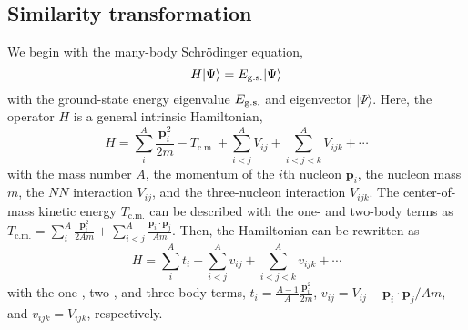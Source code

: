 \documentclass[aps,prc, dvips, twocolumn,groupedaddress,showkeys,showpacs,floatfix,superscriptaddress]{revtex4-1}
\newcommand{\<}{\langle}
\renewcommand{\>}{\rangle}
\begin{document}
 \subsection{Similarity transformation\label{sec:sim}}
We begin with the many-body Schr\"odinger equation,
 \begin{equation}
   \label{sch_eq_ori}
   H|\Psi\> = E_{\rm g.s.}|\Psi\>
 \end{equation}
 with the ground-state energy eigenvalue $E_{\rm g.s.}$ and eigenvector $|\Psi\>$.
Here, the operator $H$ is a general intrinsic Hamiltonian,
\begin{equation}
 H= \sum_{i}^{A}\frac{\mathbf{p}^{2}_{i}}{2m} - T_{\text{c.m.}} + \sum_{i<j}^{A}
  V_{ij} + \sum_{i<j<k}^{A} V_{ijk} + \cdots
\label{H_ori}
\end{equation}
with the mass number $A$, the momentum of the $i$th nucleon $\mathbf{p}_{i}$,
 the nucleon mass $m$,
 the $NN$ interaction $V_{ij}$, and the three-nucleon interaction $V_{ijk}$.
The center-of-mass kinetic energy $T_{\text{c.m.}}$
can be described with the one- and two-body terms as $T_{\text{c.m.}} =
 \sum_{i}^{A}\frac{\mathbf{p}^{2}_{i}}{2Am} +
 \sum_{i<j}^{A}\frac{\mathbf{p}_{i} \cdot \mathbf{p}_{j}}{Am}$.
Then, the Hamiltonian can be rewritten as
\begin{equation}
 \label{H_ori2}
  H=\sum_{i}^{A}t_{i}+\sum_{i<j}^{A}v_{ij} + \sum_{i<j<k}^{A}v_{ijk} + \cdots
\end{equation}
with the one-, two-, and three-body terms,
$t_{i}=\frac{A-1}{A}\frac{\mathbf{p}_{i}^{2}}{2m}$,
$v_{ij} = V_{ij} - \mathbf{p}_{i} \cdot \mathbf{p}_{j} / Am$,
and $v_{ijk} = V_{ijk}$, respectively.
\end{document}
